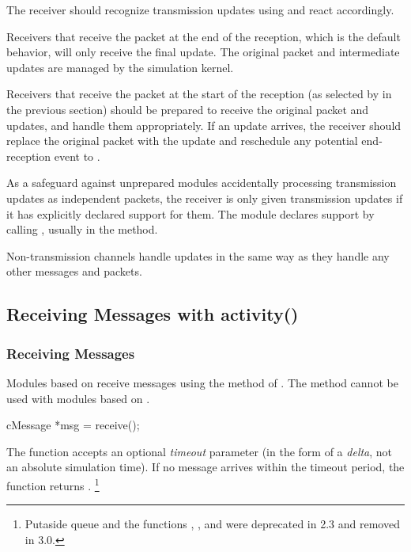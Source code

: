 The receiver should recognize transmission updates using  and
react accordingly.

Receivers that receive the packet at the end of the reception, which is the
default behavior, will only receive the final update. The original packet and
intermediate updates are managed by the simulation kernel.

Receivers that receive the packet at the start of the reception (as selected by
 in the previous section) should be prepared
to receive the original packet and updates, and handle them appropriately. If an
update arrives, the receiver should replace the original packet with the update
and reschedule any potential end-reception event to .

As a safeguard against unprepared modules accidentally processing transmission
updates as independent packets, the receiver is only given transmission updates
if it has explicitly declared support for them. The module declares support
by calling , usually in the  method.

Non-transmission channels handle updates in the same way as they handle any other
messages and packets.

\subsection{Receiving Messages with activity()}
\label{sec:simple-modules:receiving-with-activity}

\subsubsection{Receiving Messages}
\label{sec:simple-modules:receive}

Modules based on  receive messages using the 
method of . The  method cannot be used with
modules based on .

\begin{cpp}
cMessage *msg = receive();
\end{cpp}

The  function accepts an optional \textit{timeout}
parameter (in the form of a \textit{delta}, not an
absolute simulation time). If no message arrives within the timeout period,
the function returns .
    \footnote{Putaside queue and the functions ,
    , and  were deprecated
    in {\opp} 2.3 and removed in {\opp} 3.0.}


